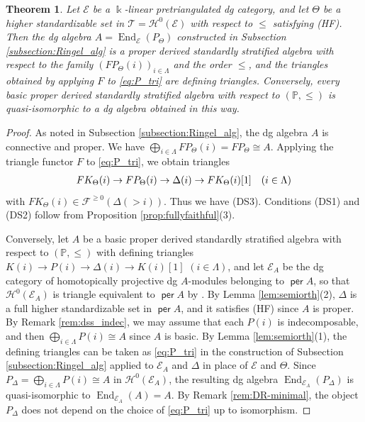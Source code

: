\documentclass[a4paper,reqno,11pt]{amsart}
\numberwithin{equation}{section}
\newtheorem{theorem}{Theorem}[section]
\theoremstyle{definition}
\newcommand{\E}{\mathcal{E}}
\newcommand{\F}{\mathcal{F}}
\renewcommand{\H}{\mathcal{H}}
\newcommand{\T}{\mathcal{T}}
\newcommand{\PP}{\mathbb{P}}
\newcommand{\bte}{\Theta}
\newcommand{\bde}{\Delta}
\newcommand{\kk}{\Bbbk}
\DeclareMathOperator{\per}{\mathsf{per}}
\DeclareMathOperator{\End}{End}
\begin{document}
\begin{theorem}\label{thm:standardization}
Let $\E$ be a $\kk$-linear pretriangulated dg category, and let $\bte$ be a higher standardizable set in $\T=\H^{0}(\E)$ with respect to $\leq$ satisfying (HF).
Then the dg algebra $A=\End_{\E}(P_{\bte})$ constructed in Subsection \ref{subsection:Ringel_alg} is a proper derived standardly stratified algebra with respect to the family $(FP_{\bte}(i))_{i\in\Lambda}$ and the order $\leq$, and the triangles obtained by applying $F$ to \eqref{eq:P_tri} are defining triangles.
Conversely, every basic proper derived standardly stratified algebra with respect to $(\PP,\leq)$ is quasi-isomorphic to a dg algebra obtained in this way.
\end{theorem}
\begin{proof}
As noted in Subsection \ref{subsection:Ringel_alg}, the dg algebra $A$ is connective and proper.
We have $\bigoplus_{i\in\Lambda}FP_{\bte}(i)=FP_{\bte}\cong A$.
Applying the triangle functor $F$ to \eqref{eq:P_tri}, we obtain triangles
\begin{align}
FK_{\bte}(i)\to FP_{\bte}(i)\to\bde(i)\to FK_{\bte}(i)[1]\quad(i\in\Lambda)\notag
\end{align}
with $FK_{\bte}(i)\in\F^{\geq 0}(\bde(>i))$. Thus we have (DS3).
Conditions (DS1) and (DS2) follow from Proposition \ref{prop:fullyfaithful}(3).

Conversely, let $A$ be a basic proper derived standardly stratified algebra with respect to $(\PP,\leq)$ with defining triangles $K(i)\to P(i)\to\bde(i)\to K(i)[1]$ $(i\in\Lambda)$, and let $\E_{A}$ be the dg category of homotopically projective dg $A$-modules belonging to $\per A$, so that $\H^{0}(\E_{A})$ is triangle equivalent to $\per A$ by \cite[4.1]{K94}.
By Lemma \ref{lem:semiorth}(2), $\bde$ is a full higher standardizable set in $\per A$, and it satisfies (HF) since $A$ is proper.
By Remark \ref{rem:dss_indec}, we may assume that each $P(i)$ is indecomposable, and then $\bigoplus_{i\in\Lambda}P(i)\cong A$ since $A$ is basic.
By Lemma \ref{lem:semiorth}(1), the defining triangles can be taken as \eqref{eq:P_tri} in the construction of Subsection \ref{subsection:Ringel_alg} applied to $\E_{A}$ and $\bde$ in place of $\E$ and $\bte$.
Since $P_{\bde}=\bigoplus_{i\in\Lambda}P(i)\cong A$ in $\H^{0}(\E_{A})$, the resulting dg algebra $\End_{\E_{A}}(P_{\bde})$ is quasi-isomorphic to $\End_{\E_{A}}(A)=A$.
By Remark \ref{rem:DR-minimal}, the object $P_{\bde}$ does not depend on the choice of \eqref{eq:P_tri} up to isomorphism.
\end{proof}
\end{document}
